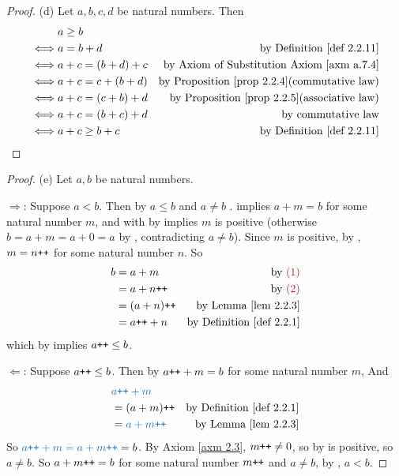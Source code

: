 \begin{proof}{(d)}
Let \(a, b, c, d\) be natural numbers. Then
\begin{align*}
         & a \geq b \\
    \iff & a = b + d             & \text{by \DEF{2.2.11}} \\
    \iff & a + c = (b + d) + c   & \text{by Axiom of Substitution \AXM{a.7.4}} \\ 
    \iff & a + c = c + (b + d)   & \text{by \PROP{2.2.4}(commutative law)} \\
    \iff & a + c = (c + b) + d   & \text{by \PROP{2.2.5}(associative law)} \\
    \iff & a + c = (b + c) + d   & \text{by commutative law} \\
    \iff & a + c \geq b + c      & \text{by \DEF{2.2.11}}
\end{align*}
\end{proof}

\begin{proof}{(e)}
Let \(a, b\) be natural numbers.

\(\Longrightarrow \): Suppose \(a < b\). Then by  \(a \leq b\)  and \(a \neq b\) .  implies \(a + m = b\)  for some natural number \(m\), and with  by  implies \(m\) is positive (otherwise \(b = a + m = a + 0 = a\) by , contradicting \(a \neq b\)). Since \(m\) is positive, by , \(m = n\texttt{++}\)  for some natural number \(n\). So
\begin{align*}
    b & = a + m & \text{by \MAROON{(1)}}\\
      & = a + n\INC & \text{by \MAROON{(2)}}\\
      & = (a + n)\INC & \text{by \LEM{2.2.3}} \\
      & = a\INC + n & \text{by \DEF{2.2.1}}
\end{align*}
which by  implies \(a\texttt{++} \leq b\).

\( \Longleftarrow \): Suppose \(a\texttt{++} \leq b\). Then by  \(a\texttt{++} + m = b\) for some natural number \(m\), And
\begin{align*}
    & \BLUE{a\INC + m} \\
    & = (a + m)\INC & \text{by \DEF{2.2.1}} \\
    & = \BLUE{a + m\INC} & \text{by \LEM{2.2.3}}
\end{align*}
So \(\BLUE{a\INC + m = a + m\INC} = b\). By Axiom \ref{axm 2.3}, \(m\texttt{++} \neq 0\), so by  is positive, so \(a \neq b\). So \(a + m\texttt{++} = b\) for some natural number \(m\texttt{++}\) and \(a \neq b\), by , \(a < b\).
\end{proof}

